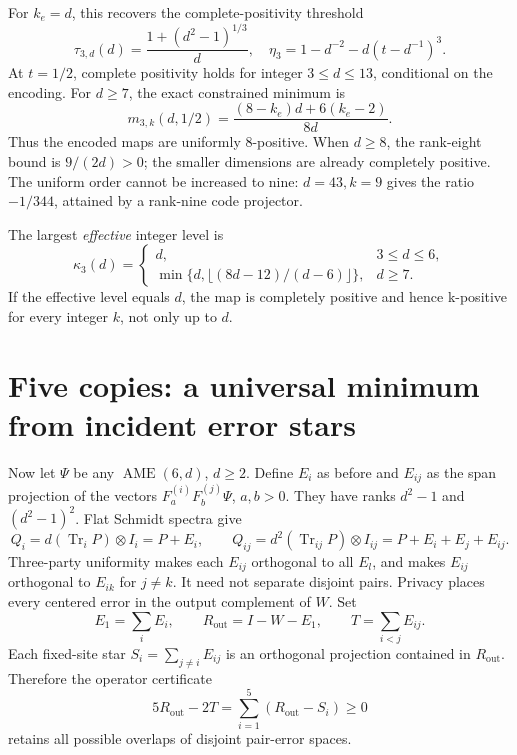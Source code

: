 \documentclass[11pt,a4paper]{article}
\newcommand{\Tr}{\operatorname{Tr}}
\begin{document}
For \(k_e=d\), this recovers the complete-positivity threshold
\begin{equation}\label{eq:tau3}
 \tau_{3,d}(d)=\frac{1+(d^2-1)^{1/3}}d,
 \quad \eta_3=1-d^{-2}-d(t-d^{-1})^3.
\end{equation}
At \(t=1/2\), complete positivity holds for integer \(3\le d\le13\), conditional on the encoding. For \(d\ge7\), the exact constrained minimum is
\begin{equation}\label{eq:rank3endpoint}
 m_{3,k}(d,1/2)=\frac{(8-k_e)d+6(k_e-2)}{8d}.
\end{equation}
Thus the encoded maps are uniformly 8-positive. When \(d\ge8\), the rank-eight bound is \(9/(2d)>0\); the smaller dimensions are already completely positive. The uniform order cannot be increased to nine: \(d=43,k=9\) gives the ratio \(-1/344\), attained by a rank-nine code projector.

The largest \emph{effective} integer level is
\[
 \kappa_3(d)=\begin{cases}
 d,&3\le d\le6,\\
 \min\{d,\lfloor(8d-12)/(d-6)\rfloor\},&d\ge7.
 \end{cases}
\]
If the effective level equals \(d\), the map is completely positive and hence k-positive for every integer \(k\), not only up to \(d\).

\section{Five copies: a universal minimum from incident error stars}
Now let \(\Psi\) be any \(\operatorname{AME}(6,d)\), \(d\ge2\). Define \(E_i\) as before and \(E_{ij}\) as the span projection of the vectors \(F_a^{(i)}F_b^{(j)}\Psi\), \(a,b>0\). They have ranks \(d^2-1\) and \((d^2-1)^2\). Flat Schmidt spectra give
\[
 Q_i=d(\Tr_iP)\otimes I_i=P+E_i,\qquad
 Q_{ij}=d^2(\Tr_{ij}P)\otimes I_{ij}=P+E_i+E_j+E_{ij}.
\]
Three-party uniformity makes each \(E_{ij}\) orthogonal to all \(E_l\), and makes \(E_{ij}\) orthogonal to \(E_{ik}\) for \(j\ne k\). It need not separate disjoint pairs. Privacy places every centered error in the output complement of \(W\). Set
\[
 E_1=\sum_iE_i,\qquad R_{\mathrm{out}}=I-W-E_1,\qquad
 T=\sum_{i<j}E_{ij}.
\]
Each fixed-site star \(S_i=\sum_{j\ne i}E_{ij}\) is an orthogonal projection contained in \(R_{\mathrm{out}}\). Therefore the operator certificate
\begin{equation}\label{eq:star}
 5R_{\mathrm{out}}-2T=\sum_{i=1}^5(R_{\mathrm{out}}-S_i)\ge0
\end{equation}
retains all possible overlaps of disjoint pair-error spaces.
\end{document}

